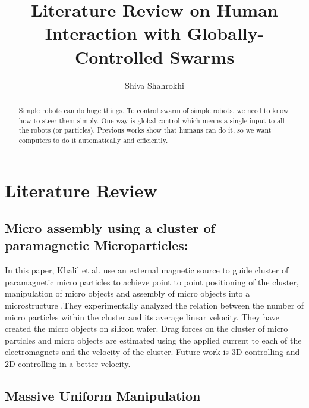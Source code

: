 \documentclass[letterpaper, 10 pt, conference]{ieeeconf}
\begin{document}
\author{Shiva Shahrokhi}
\title{Literature Review on Human Interaction with Globally-Controlled Swarms}
\maketitle

\begin{abstract}

Simple robots can do huge things. To control swarm of simple robots, we need to know how to steer them simply. One way is global control which means a single input to all the robots (or particles). Previous works show that humans can do it, so we want computers to do it automatically and efficiently.
 
\end{abstract}

\section{Literature Review}
\subsection{Micro assembly using a cluster of paramagnetic Microparticles:}

In this paper, Khalil et al. use an external magnetic source to guide cluster of paramagnetic micro particles to achieve point to point positioning of the cluster, manipulation of micro objects and assembly of micro objects into a microstructure \cite{Khalil2013}.They experimentally analyzed the relation between the number of micro particles within the cluster and its average linear velocity. They have created the micro objects on silicon wafer. Drag forces on the cluster of micro particles and micro objects are estimated using the applied current to each of the electromagnets and the velocity of the cluster. Future work is 3D controlling and 2D controlling in a better velocity.

\subsection{Massive Uniform Manipulation}
\end{document}
